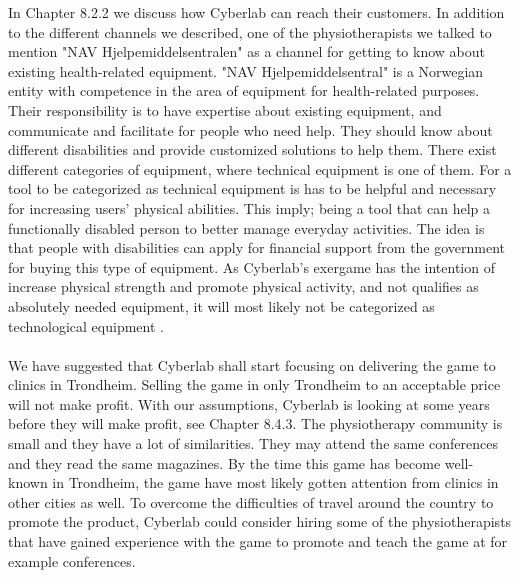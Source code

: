 In Chapter 8.2.2 we discuss how Cyberlab can reach their customers. In addition to the different channels we described, one of the physiotherapists we talked to mention "NAV Hjelpemiddelsentralen" as a channel for getting to know about existing health-related equipment. "NAV Hjelpemiddelsentral" is a Norwegian entity with competence in the area of equipment for health-related purposes. Their responsibility is to have expertise about existing equipment, and communicate and facilitate for people who need help. They should know about different disabilities and provide customized solutions to help them. There exist different categories of equipment, where technical equipment is one of them. For a tool to be categorized as technical equipment is has to be helpful and necessary for increasing users' physical abilities. This imply; being a tool that can help a functionally disabled person to better manage everyday activities. The idea is that people with disabilities can apply for financial support from the government for buying this type of equipment. As Cyberlab’s exergame has the intention of increase physical strength and promote physical activity, and not qualifies as absolutely needed equipment, it will most likely not be categorized as technological equipment \cite{navhjelpemiddel} \cite{navhjelpemiddelsentralen}.  \\ \\
We have suggested that Cyberlab shall start focusing on delivering the game to clinics in Trondheim. Selling the game in only Trondheim to an acceptable price will not make profit. With our assumptions, Cyberlab is looking at some years before they will make profit, see Chapter 8.4.3. The physiotherapy community is small and they have a lot of similarities. They may attend the same conferences and they read the same magazines. By the time this game has become well-known in Trondheim, the game have most likely gotten attention from clinics in other cities as well. To overcome the difficulties of travel around the country to promote the product, Cyberlab could consider hiring some of the physiotherapists that have gained experience with the game to promote and teach the game at for example conferences.\\ \\

